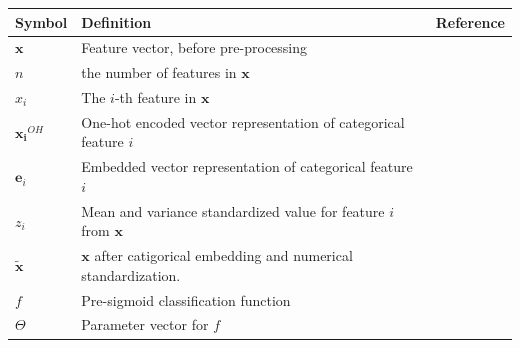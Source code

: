 \documentclass{mldsmsc}
\begin{document}
\begin{table}[ht]
    \begin{tabular}{|l|l|l|}
      \hline
        \textbf{Symbol} & \textbf{Definition} & \textbf{Reference} \\
      \hline
        $\mathbf{x}$& Feature vector, before pre-processing &\\
        $n$ & the number of features in $\mathbf{x}$ &\\
        $x_i$& The $i$-th feature in $\mathbf{x}$ &\\
        $\mathbf{x_i}^{OH}$ & One-hot encoded vector representation of categorical feature $i$ &\\
        $\mathbf{e}_i$ & Embedded vector representation of categorical feature $i$ & \\
        $z_i$ & Mean and variance standardized value for feature $i$ from $\mathbf{x}$ &\\
        $\tilde{\mathbf{x}}$ & $\mathbf{x}$ after catigorical embedding and numerical standardization. &\\
        $f$ & Pre-sigmoid classification function &\\
        $\Theta$ & Parameter vector for $f$ & \\
    \hline
    \end{tabular}
\end{table}




\end{document}
